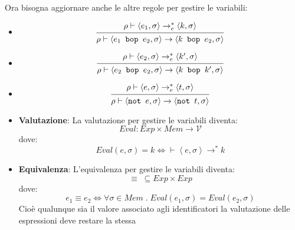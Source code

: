 \documentclass[a4paper]{article}
\begin{document}
\vspace{1em}
\noindent
Ora bisogna aggiornare anche le altre regole per gestire le variabili:
\begin{itemize}
  \item 
    \[
      \begin{prooftree}
        \hypo{ 
          \rho \vdash \left< e_1, \sigma \right> \to^*_e \left< k, \sigma \right>
        }
        \infer1{
          \rho \vdash \left< e_1 \texttt{ bop } e_2, \sigma \right> \to
          \left<k \texttt{ bop } e_2, \sigma \right>
        }
      \end{prooftree}
    \] 

  \item
    \[
      \begin{prooftree}
        \hypo{ 
          \rho \vdash \left< e_2, \sigma \right> \to^*_e \left< k', \sigma \right>
        }
        \infer1{ 
          \rho \vdash \left< e_2 \texttt{ bop } e_2, \sigma \right> \to
          \left<k \texttt{ bop } k', \sigma \right>
        }
      \end{prooftree}
    \] 

    \item
      \[
        \begin{prooftree}
          \hypo{ 
            \rho \vdash \left< e, \sigma \right> \to^*_e \left< t, \sigma \right>
          }
          \infer1{ 
            \rho \vdash \left< \texttt{not } e, \sigma \right> \to
            \left<\texttt{not } t, \sigma \right>
          }
        \end{prooftree}
      \] 
\end{itemize}

\vspace{1em}
\noindent
\begin{itemize}
  \item \textbf{Valutazione}: La valutazione per gestire le variabili diventa:
    \[
      Eval: Exp \times Mem \to \mathcal{V}
    \] 
    dove:
    \[
      Eval(e, \sigma) = k \iff \vdash \left< e, \sigma \right> \to^* k
    \] 

  \item \textbf{Equivalenza}: L'equivalenza per gestire le variabili diventa:
    \[
      \equiv \; \subseteq Exp \times Exp
    \]
    dove:
    \[
      e_1 \equiv e_2 \iff \forall \sigma \in Mem \;.\; Eval(e_1, \sigma) = Eval(e_2, \sigma)
    \] 
    Cioè qualunque sia il valore associato agli identificatori la valutazione delle
    espressioni deve restare la stessa
\end{itemize}
\end{document}

